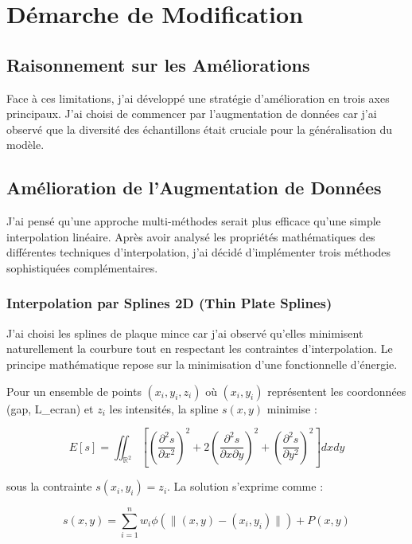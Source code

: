 \documentclass[10pt,twocolumn]{article}
\begin{document}
\section{Démarche de Modification}

\subsection{Raisonnement sur les Améliorations}

Face à ces limitations, j'ai développé une stratégie d'amélioration en trois axes principaux. J'ai choisi de commencer par l'augmentation de données car j'ai observé que la diversité des échantillons était cruciale pour la généralisation du modèle.

\subsection{Amélioration de l'Augmentation de Données}

J'ai pensé qu'une approche multi-méthodes serait plus efficace qu'une simple interpolation linéaire. Après avoir analysé les propriétés mathématiques des différentes techniques d'interpolation, j'ai décidé d'implémenter trois méthodes sophistiquées complémentaires.

\subsubsection{Interpolation par Splines 2D (Thin Plate Splines)}

J'ai choisi les splines de plaque mince car j'ai observé qu'elles minimisent naturellement la courbure tout en respectant les contraintes d'interpolation. Le principe mathématique repose sur la minimisation d'une fonctionnelle d'énergie.

Pour un ensemble de points $(x_i, y_i, z_i)$ où $(x_i, y_i)$ représentent les coordonnées (gap, L\_ecran) et $z_i$ les intensités, la spline $s(x,y)$ minimise :

\begin{equation}
E[s] = \iint_{\mathbb{R}^2} \left[ \left(\frac{\partial^2 s}{\partial x^2}\right)^2 + 2\left(\frac{\partial^2 s}{\partial x \partial y}\right)^2 + \left(\frac{\partial^2 s}{\partial y^2}\right)^2 \right] dx dy
\end{equation}

sous la contrainte $s(x_i, y_i) = z_i$. La solution s'exprime comme :

\begin{equation}
s(x,y) = \sum_{i=1}^{n} w_i \phi(\|(x,y) - (x_i,y_i)\|) + P(x,y)
\end{equation}
\end{document}
